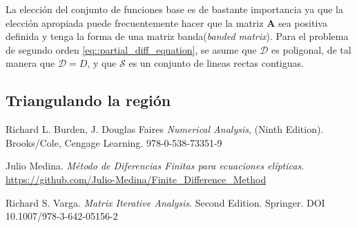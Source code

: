 \documentclass[a4paper]{article}
\begin{document}
La elección del conjunto de funciones base es de bastante importancia ya que la elección apropiada puede frecuentemente hacer que la matriz $\mathbf{A}$ sea positiva definida y tenga la forma de una matriz banda(\textit{banded matrix}). Para el problema de segundo orden \ref{eq::partial_diff_equation}, se asume que $\mathcal{D}$ es poligonal, de tal manera que $\mathcal{D}=D$, y que $\mathcal{S}$ es un conjunto de lineas rectas contiguas.

\subsection{Triangulando la región}


\begin{thebibliography}{99}


 Richard L. Burden, J. Douglas Faires \textit{Numerical Analysis}, (Ninth Edition). Brooks/Cole, Cengage Learning. 978-0-538-73351-9

 Julio Medina. \textit{Método de Diferencias Finitas para ecuaciones elípticas}. \url{https://github.com/Julio-Medina/Finite_Difference_Method}

 Richard S. Varga. \textit{Matrix Iterative Analysis}. Second Edition. Springer. DOI 10.1007/978-3-642-05156-2






\end{thebibliography}
\end{document}
